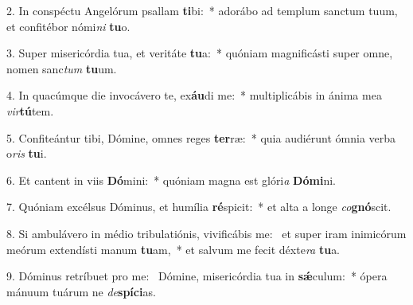 2. In conspéctu Angelórum psallam \textbf{ti}bi:~*  adorábo ad templum sanctum tuum, et confitébor nómi\textit{ni} \textbf{tu}o.\

3. Super misericórdia tua, et veritáte \textbf{tu}a:~*  quóniam magnificásti super omne, nomen sanc\textit{tum} \textbf{tu}um.\

4. In quacúmque die invocávero te, ex\textbf{áu}di me:~*  multiplicábis in ánima mea \textit{vir}\textbf{tú}tem.\

5. Confiteántur tibi, Dómine, omnes reges \textbf{ter}ræ:~*  quia audiérunt ómnia verba o\textit{ris} \textbf{tu}i.\

6. Et cantent in viis \textbf{Dó}mini:~*  quóniam magna est glóri\textit{a} \textbf{Dó}\textbf{mi}ni.\

7. Quóniam excélsus Dóminus, et humília \textbf{ré}spicit:~*  et alta a longe \textit{co}\textbf{gnó}scit.\

8. Si ambulávero in médio tribulatiónis, vivificábis me: \dag\  et super iram inimicórum meórum extendísti manum \textbf{tu}am,~*  et salvum me fecit déxte\textit{ra} \textbf{tu}a.\

9. Dóminus retríbuet pro me: \dag\  Dómine, misericórdia tua in \textbf{sǽ}culum:~*  ópera mánuum tuárum ne \textit{de}\textbf{spí}\textbf{ci}as.\


